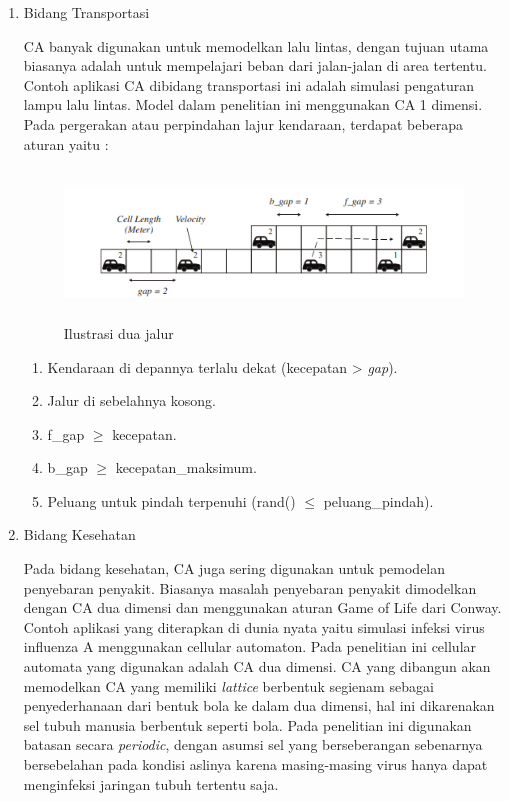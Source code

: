 		\begin{enumerate}
			\item Bidang Transportasi
			
			CA banyak digunakan untuk memodelkan lalu lintas, dengan tujuan utama biasanya adalah untuk mempelajari beban dari jalan-jalan di area tertentu. Contoh aplikasi CA dibidang transportasi ini adalah simulasi pengaturan lampu lalu lintas. Model dalam penelitian ini menggunakan CA 1 dimensi. Pada pergerakan  atau perpindahan lajur kendaraan, terdapat beberapa aturan yaitu : 

	\begin{figure} [H]
		\centering  
		\includegraphics[width=12cm, height=4cm]{aplikasi1} 
		\caption[Ilustrasi dua jalur]{Ilustrasi dua jalur} 
		\label{fig:aplikasiCA1} 
	\end{figure}
				\begin{enumerate}
				\item Kendaraan di depannya terlalu dekat (kecepatan >   \textit{gap}).
				\item Jalur di sebelahnya kosong.
				\item f\_gap $\geq$ kecepatan.
				\item b\_gap $\geq$ kecepatan\_maksimum.
				\item Peluang untuk pindah terpenuhi (rand() $\leq$ peluang\_pindah). \cite{referensiCA3}
			
			\end{enumerate}
			
			
			\item Bidang Kesehatan
			
			Pada bidang kesehatan, CA juga sering digunakan untuk pemodelan penyebaran penyakit. Biasanya masalah penyebaran penyakit dimodelkan dengan CA dua dimensi dan menggunakan aturan Game of Life dari Conway. Contoh aplikasi yang diterapkan di dunia nyata yaitu simulasi infeksi virus influenza A menggunakan cellular automaton. Pada penelitian ini cellular automata yang digunakan adalah CA dua dimensi. CA yang dibangun akan memodelkan CA yang memiliki \textit{lattice} berbentuk segienam sebagai penyederhanaan dari bentuk bola ke dalam dua dimensi, hal ini dikarenakan sel tubuh manusia berbentuk seperti bola. Pada penelitian ini digunakan batasan secara \textit{periodic}, dengan asumsi sel yang berseberangan sebenarnya bersebelahan pada kondisi aslinya karena masing-masing virus hanya dapat menginfeksi jaringan tubuh tertentu saja. \cite{referensiCA1}
			

\end{enumerate}
